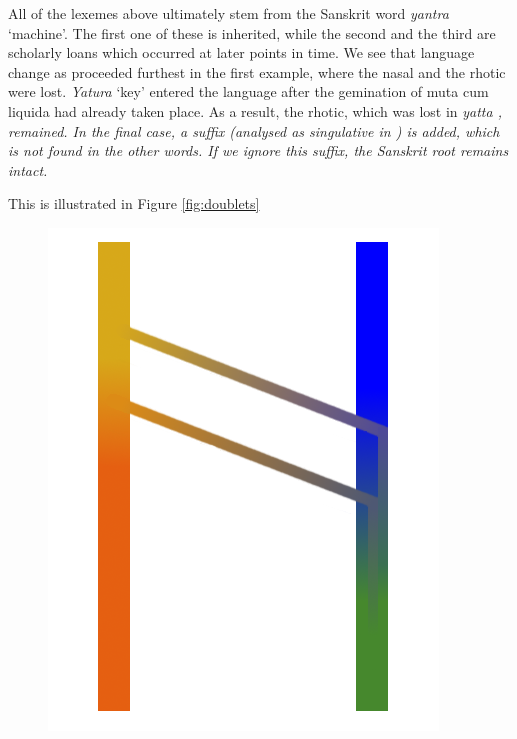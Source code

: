 \documentclass[a4paper,10pt]{article}
\newcommand{\trs}[2]{\textit{#1} `#2'}
\begin{document}
All of the lexemes above ultimately stem from the Sanskrit word \trs{yantra}{machine}.
The first one of these is inherited, while the second and the third are scholarly loans which occurred at later points in time. We see that language change as proceeded furthest in the first example, where the nasal and the rhotic were lost. \trs{Yatura}{key} entered the language after the gemination of muta cum liquida had already taken place. As a result, the rhotic, which was lost in \em yatta \em, remained.  In the final case, a suffix (analysed as singulative in \citet{NitzEtAl2009}) is added, which is not found in the other words. If we ignore this suffix, the Sanskrit root remains intact. 


This is illustrated in Figure \ref{fig:doublets}

\begin{figure}
\centering
    \includegraphics[height=.3\textheight]{doublet.png}

\end{figure}
\end{document}
